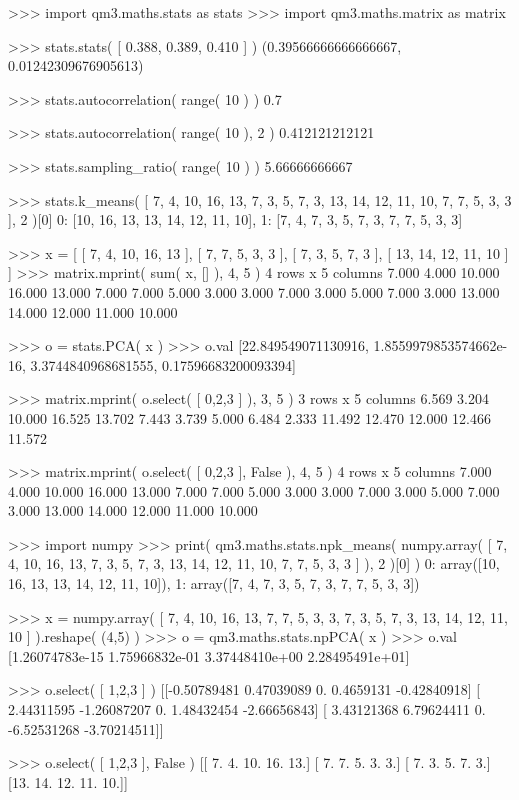 \footnotesize
\begin{pyglist}[language=python,fvset={frame=single}]
>>> import qm3.maths.stats as stats
>>> import qm3.maths.matrix as matrix

>>> stats.stats( [ 0.388, 0.389, 0.410 ] )
(0.39566666666666667, 0.01242309676905613)

>>> stats.autocorrelation( range( 10 ) )
0.7

>>> stats.autocorrelation( range( 10 ), 2 )
0.412121212121

>>> stats.sampling_ratio( range( 10 ) )
5.66666666667

>>> stats.k_means( [ 7, 4, 10, 16, 13, 7, 3, 5, 7, 3, 13, 14, 12, 11, 10, 7, 7, 5, 3, 3 ], 2 )[0]
{0: [10, 16, 13, 13, 14, 12, 11, 10], 1: [7, 4, 7, 3, 5, 7, 3, 7, 7, 5, 3, 3]}

>>> x = [ [ 7, 4, 10, 16, 13 ], [ 7, 7, 5, 3, 3 ], [ 7, 3, 5, 7, 3 ], [ 13, 14, 12, 11, 10 ] ]
>>> matrix.mprint( sum( x, [] ), 4, 5 )
4 rows x 5 columns
     7.000     4.000    10.000    16.000    13.000
     7.000     7.000     5.000     3.000     3.000
     7.000     3.000     5.000     7.000     3.000
    13.000    14.000    12.000    11.000    10.000

>>> o = stats.PCA( x )
>>> o.val
[22.849549071130916, 1.8559979853574662e-16, 3.3744840968681555, 0.17596683200093394]

>>> matrix.mprint( o.select( [ 0,2,3 ] ), 3, 5 )
3 rows x 5 columns
     6.569     3.204    10.000    16.525    13.702
     7.443     3.739     5.000     6.484     2.333
    11.492    12.470    12.000    12.466    11.572

>>> matrix.mprint( o.select( [ 0,2,3 ], False ), 4, 5 )
4 rows x 5 columns
     7.000     4.000    10.000    16.000    13.000
     7.000     7.000     5.000     3.000     3.000
     7.000     3.000     5.000     7.000     3.000
    13.000    14.000    12.000    11.000    10.000

>>> import numpy
>>> print( qm3.maths.stats.npk_means( numpy.array(
         [ 7, 4, 10, 16, 13, 7, 3, 5, 7, 3, 13, 14, 12, 11, 10, 7, 7, 5, 3, 3 ] ), 2 )[0] )
{0: array([10, 16, 13, 13, 14, 12, 11, 10]), 1: array([7, 4, 7, 3, 5, 7, 3, 7, 7, 5, 3, 3])}

>>> x = numpy.array( [ 7, 4, 10, 16, 13, 7, 7, 5, 3, 3, 7, 3, 5, 7, 3, 13, 14, 12, 11, 10 ] ).reshape( (4,5) )
>>> o = qm3.maths.stats.npPCA( x )
>>> o.val
[1.26074783e-15 1.75966832e-01 3.37448410e+00 2.28495491e+01]

>>> o.select( [ 1,2,3 ] )
[[-0.50789481  0.47039089  0.          0.4659131  -0.42840918]
 [ 2.44311595 -1.26087207  0.          1.48432454 -2.66656843]
 [ 3.43121368  6.79624411  0.         -6.52531268 -3.70214511]]

>>> o.select( [ 1,2,3 ], False )
[[ 7.  4. 10. 16. 13.]
 [ 7.  7.  5.  3.  3.]
 [ 7.  3.  5.  7.  3.]
 [13. 14. 12. 11. 10.]]
\end{pyglist}
